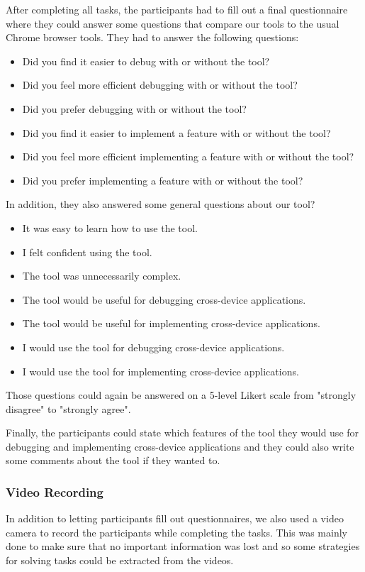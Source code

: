 After completing all tasks, the participants had to fill out a final questionnaire where they could answer some questions that compare our tools to the usual Chrome browser tools. They had to answer the following questions:
\begin{itemize}
	\item Did you find it easier to debug with or without the tool?
	\item Did you feel more efficient debugging with or without the tool?
	\item Did you prefer debugging with or without the tool?
	\item Did you find it easier to implement a feature with or without the tool?
	\item Did you feel more efficient implementing a feature with or without the tool?
	\item Did you prefer implementing a feature with or without the tool?
\end{itemize}

In addition, they also answered some general questions about our tool?
\begin{itemize}
	\item It was easy to learn how to use the tool.
	\item I felt confident using the tool.
	\item The tool was unnecessarily complex.
	\item The tool would be useful for debugging cross-device applications.
	\item The tool would be useful for implementing cross-device applications.
	\item I would use the tool for debugging cross-device applications.
	\item I would use the tool for implementing cross-device applications.
\end{itemize}
Those questions could again be answered on a 5-level Likert scale from "strongly disagree" to "strongly agree".

Finally, the participants could state which features of the tool they would use for debugging and implementing cross-device applications and they could also write some comments about the tool if they wanted to.

\subsubsection{Video Recording}
In addition to letting participants fill out questionnaires, we also used a video camera to record the participants while completing the tasks. This was mainly done to make sure that no important information was lost and so some strategies for solving tasks could be extracted from the videos. 

